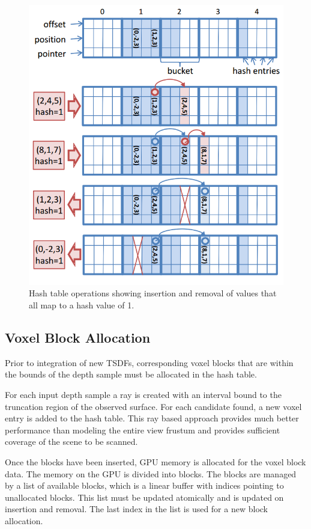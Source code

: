 \documentclass[10pt, twocolumn]{article}
\begin{document}
\begin{figure}
  \centering
  \includegraphics[width=1.0\linewidth]{hashtableoperations}
  \caption{Hash table operations showing insertion and removal of values that
    all map to a hash value of 1.}
  \label{fig:hashingoperations}
\end{figure}


\subsection{Voxel Block Allocation}
Prior to integration of new TSDFs, corresponding voxel blocks that are within
the bounds of the depth sample must be allocated in the hash table. 

For each input depth sample a ray is created with an interval bound to the
truncation region of the observed surface. For each candidate found, a new voxel
entry is added to the hash table. This ray based approach provides much better
performance than modeling the entire view frustum and provides sufficient
coverage of the scene to be scanned.

Once the blocks have been inserted, GPU memory is allocated for the voxel block
data. The memory on the GPU is divided into blocks. The blocks are managed by a
list of available blocks, which is a linear buffer with indices pointing to
unallocated blocks. This list must be updated atomically and is updated on
insertion and removal. The last index in the list is used for a new block allocation.
\end{document}
